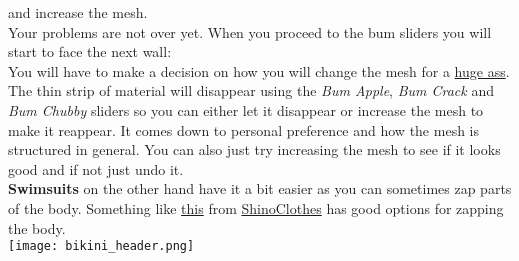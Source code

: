 and increase the mesh.\\
Your problems are not over yet. When you proceed to the bum sliders you will start to face the next wall:\\
You will have to make a decision on how you will change the mesh for a \href{https://i0.kym-cdn.com/photos/images/newsfeed/000/687/918/eb6.jpg}{huge ass}. 
The thin strip of material will disappear using the \textit{Bum Apple}, \textit{Bum Crack} and \textit{Bum Chubby} sliders so you can 
either let it disappear or increase the mesh to make it reappear. It comes down to personal preference and how the mesh is structured 
in general. You can also just try increasing the mesh to see if it looks good and if not just undo it.\\
\textbf{Swimsuits} on the other hand have it a bit easier as you can sometimes zap parts of the body. Something like \href{https://staticdelivery.nexusmods.com/mods/1151/images/40060/40060-1563200676-1831067690.png}{this} 
from \href{https://www.nexusmods.com/fallout4/mods/40060}{ShinoClothes} has good options for zapping the body.\\
\texttt{[image: bikini\_header.png]}